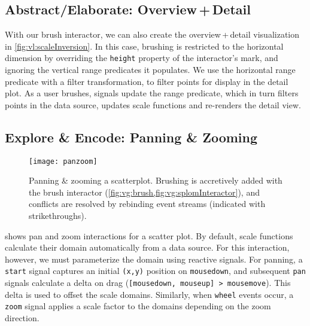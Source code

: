 \vspace{-20pt}

\subsection{Abstract/Elaborate: Overview\,+\,Detail}

\vspace{-7pt}

With our brush interactor, we can also create the overview\,+\,detail
visualization in \cref{fig:vl:scaleInversion}. In this case, brushing is
restricted to the horizontal dimension by overriding the \texttt{height}
property of the interactor's mark, and ignoring the vertical range predicates it
populates. We use the horizontal range predicate with a filter transformation,
to filter points for display in the detail plot. As a user brushes, signals
update the range predicate, which in turn filters points in the data source,
updates scale functions and re-renders the detail view.

\vspace{-20pt}

\subsection{Explore \& Encode: Panning \& Zooming}

\vspace{-7pt}

\begin{figure}[b!]
  \centering
  \texttt{[image: panzoom]}
  \caption{Panning \& zooming a scatterplot. Brushing is accretively added with
  the brush interactor (\cref{fig:vg:brush,fig:vg:splomInteractor}), and
  conflicts are resolved by rebinding event streams (indicated with
  strikethroughs).}
  \label{fig:vg:panzoom}
\end{figure}

 shows pan and zoom interactions for a scatter plot. By
default, scale functions calculate their domain automatically from a data
source. For this interaction, however, we must parameterize the domain using
reactive signals. For panning, a \texttt{start} signal captures an initial
\texttt{(x,y)} position on \texttt{mousedown}, and subsequent \texttt{pan}
signals calculate a delta on drag (\texttt{[mousedown, mouseup] > mousemove}).
This delta is used to offset the scale domains. Similarly, when \texttt{wheel}
events occur, a \texttt{zoom} signal applies a scale factor to the domains
depending on the zoom direction.

